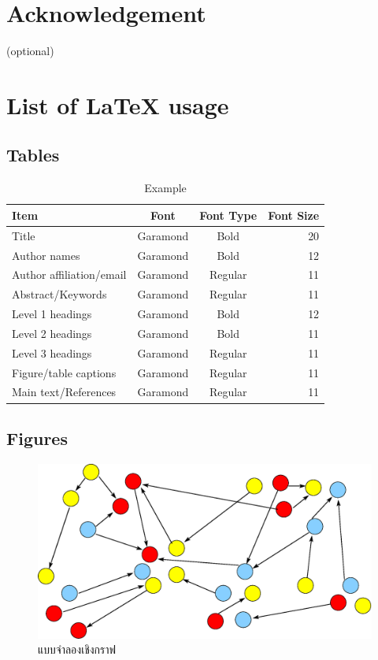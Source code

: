 \documentclass[11pt,a4paper]{article}
\begin{document}
\section{Acknowledgement}
(optional)



\section{List of LaTeX usage}

\subsection{Tables}
\begin{table}[ht]
\centering
\caption{Example} 
\vspace{3mm}
\begin{tabular}{|l|c|c|r|} \hline
Item & Font & Font Type & Font Size \\ \hline
Title &Garamond &Bold &20  \\
Author names & Garamond & Bold & 12 \\ 
Author affiliation/email & Garamond & Regular & 11 \\
Abstract/Keywords & Garamond & Regular & 11 \\
Level 1 headings & Garamond & Bold & 12 \\
Level 2 headings &Garamond & Bold & 11 \\
Level 3 headings & Garamond & Regular & 11 \\
Figure/table captions & Garamond & Regular & 11 \\
Main text/References & Garamond & Regular & 11 \\ \hline
\end{tabular}
\end{table}

\subsection{Figures}

\begin{figure}[ht]
	\begin{center}
		\includegraphics[width=0.7\linewidth]{gm.eps}
		\caption{แบบจำลองเชิงกราฟ}
	\end{center}
\end{figure}
\end{document}
